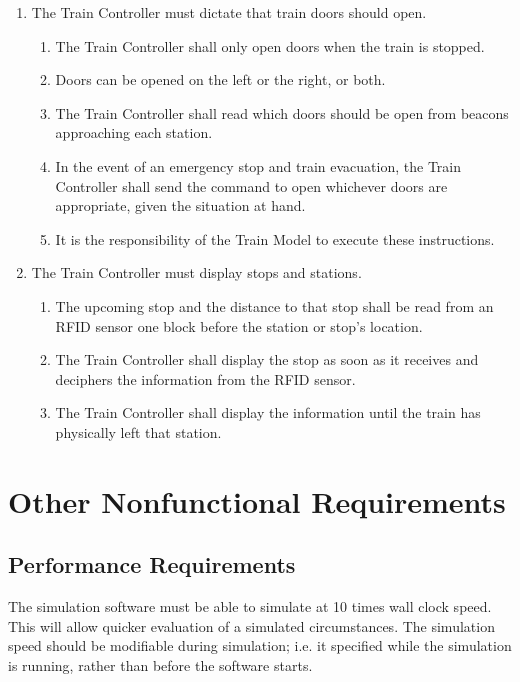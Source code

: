 \documentclass{scrreprt}
\begin{document}
\begin{enumerate}
    \item The Train Controller must dictate that train doors should open.
    \begin{enumerate}
        \item The Train Controller shall only open doors when the train is stopped.
        \item Doors can be opened on the left or the right, or both.
        \item The Train Controller shall read which doors should be open from beacons approaching each station.
        \item In the event of an emergency stop and train evacuation, the Train Controller shall send the command to open whichever doors are appropriate, given the situation at hand.
        \item It is the responsibility of the Train Model to execute these instructions.
    \end{enumerate}

    \item The Train Controller must display stops and stations.
    \begin{enumerate}
        \item The upcoming stop and the distance to that stop shall be read from an RFID sensor one block before the station or stop's location.
        \item The Train Controller shall display the stop as soon as it receives and deciphers the information from the RFID sensor.
        \item The Train Controller shall display the information until the train has physically left that station.
    \end{enumerate}
\end{enumerate}

\chapter{Other Nonfunctional Requirements}

\section{Performance Requirements}
The simulation software must be able to simulate at 10 times wall clock speed.
This will allow quicker evaluation of a simulated circumstances. The simulation
speed should be modifiable during simulation; i.e. it specified while the simulation
is running, rather than before the software starts.
\end{document}
